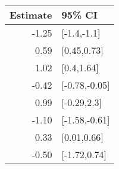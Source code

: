 \begin{tabular}{rl}
  \hline
Estimate & 95\% CI \\ 
  \hline
-1.25 & [-1.4,-1.1] \\ 
  0.59 & [0.45,0.73] \\ 
  1.02 & [0.4,1.64] \\ 
  -0.42 & [-0.78,-0.05] \\ 
  0.99 & [-0.29,2.3] \\ 
  -1.10 & [-1.58,-0.61] \\ 
  0.33 & [0.01,0.66] \\ 
  -0.50 & [-1.72,0.74] \\ 
   \hline
\end{tabular}

